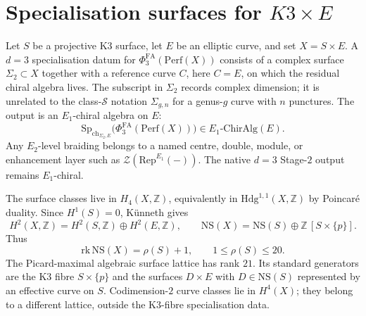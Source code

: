 
\providecommand{\kBKM}{\kappa_{\mathrm{BKM}}}
\providecommand{\kch}{\kappa_{\mathrm{ch}}}
\providecommand{\kcat}{\kappa_{\mathrm{cat}}}
\providecommand{\kfib}{\kappa_{\mathrm{fiber}}}
\providecommand{\kHeis}{\kappa_{\mathrm{ch}}^{\mathrm{Heis}}}
\providecommand{\PhiFA}{\Phi^{\mathrm{FA}}}
\providecommand{\SpCh}{\mathrm{Sp}_{\mathrm{ch}}}
\providecommand{\Perf}{\mathrm{Perf}}
\providecommand{\Coh}{\mathrm{Coh}}
\providecommand{\Rep}{\mathrm{Rep}}
\providecommand{\Aut}{\mathrm{Aut}}
\providecommand{\Fix}{\mathrm{Fix}}
\providecommand{\NS}{\mathrm{NS}}
\providecommand{\Pic}{\mathrm{Pic}}
\providecommand{\Hdg}{\mathrm{Hdg}}
\providecommand{\CHL}{\mathrm{CHL}}
\providecommand{\Bor}{\mathrm{Bor}}
\providecommand{\Eone}{E_1}
\providecommand{\Etwo}{E_2}
\providecommand{\cT}{\mathcal T}
\providecommand{\cI}{\mathcal I}
\providecommand{\cA}{\mathcal A}
\providecommand{\cM}{\mathcal M}
\providecommand{\HH}{\mathfrak H}
\providecommand{\PP}{\mathbb P}
\providecommand{\Borch}{\mathrm{Borch}}
\providecommand{\Schur}{\mathrm{Schur}}
\providecommand{\fg}{\mathfrak g}
\providecommand{\su}{\mathfrak{su}}

\section*{Specialisation surfaces for \(K3 \times E\)}
\label{wn:sec:sigma2-moduli-k3xe}

Let \(S\) be a projective K3 surface, let \(E\) be an elliptic curve, and set
\(X=S\times E\).  A \(d=3\) specialisation datum for
\(\PhiFA_3(\Perf(X))\) consists of a complex surface
\(\Sigma_2\subset X\) together with a reference curve \(C\), here
\(C=E\), on which the residual chiral algebra lives.  The subscript in
\(\Sigma_2\) records complex dimension; it is unrelated to the
class-\(\mathcal S\) notation \(\Sigma_{g,n}\) for a genus-\(g\) curve
with \(n\) punctures.  The output is an
\(\Eone\)-chiral algebra on \(E\):
\[
 \SpCh_{\Sigma_2,E}\bigl(\PhiFA_3(\Perf(X))\bigr)\in \Eone\text{-}\mathrm{ChirAlg}(E).
\]
Any \(\Etwo\)-level braiding belongs to a named centre, double, module,
or enhancement layer such as \(\mathcal Z(\Rep^{\Eone}(-))\).  The
native \(d=3\) Stage-\(2\) output remains \(\Eone\)-chiral.

The surface classes live in \(H_4(X,\mathbb Z)\), equivalently in
\(\Hdg^{1,1}(X,\mathbb Z)\) by Poincar\'e duality.  Since \(H^1(S)=0\),
K\"unneth gives
\[
 H^2(X,\mathbb Z)=H^2(S,\mathbb Z)\oplus H^2(E,\mathbb Z),\qquad
 \NS(X)=\NS(S)\oplus \mathbb Z\,[S\times\{p\}].
\]
Thus
\[
 \mathrm{rk}\,\NS(X)=\rho(S)+1,\qquad
 1\leq \rho(S)\leq 20.
\]
The Picard-maximal algebraic surface lattice has rank \(21\).  Its
standard generators are the K3 fibre \(S\times\{p\}\) and the
surfaces \(D\times E\) with \(D\in\NS(S)\) represented by an effective
curve on \(S\).  Codimension-\(2\) curve classes lie in \(H^4(X)\);
they belong to a different lattice, outside the K3-fibre
specialisation data.

